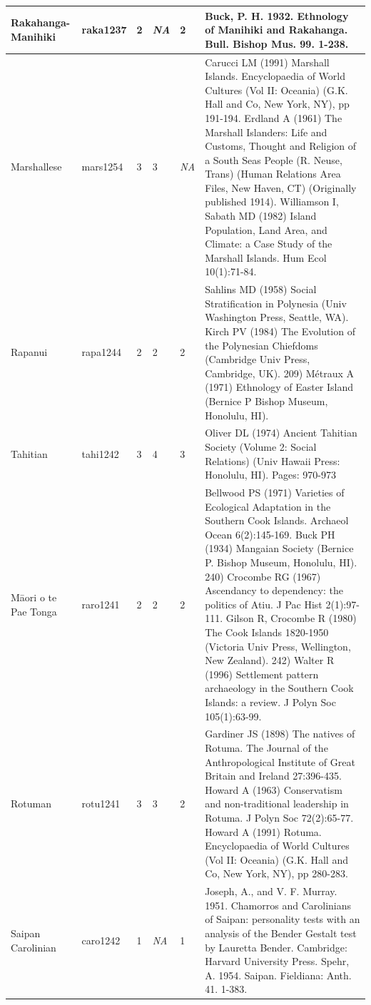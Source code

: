 \documentclass[draft,10pt]{article} %
\begin{document}
\begin{landscape}
\begin{longtable}{ | p{2cm}| p{2cm}| p{1.8cm}| p{1.8cm}| p{3cm}| p{9cm}| }
Rakahanga-Manihiki&raka1237&2&\emph{NA}&2&Buck, P. H. 1932. Ethnology of Manihiki and Rakahanga. Bull. Bishop Mus. 99. 1-238.\\ \hline
Marshallese&mars1254&3&3&\emph{NA}&Carucci LM (1991) Marshall Islands. Encyclopaedia of World Cultures (Vol II: Oceania) (G.K. Hall and Co, New York, NY), pp 191-194. Erdland A (1961) The Marshall Islanders: Life and Customs, Thought and Religion of a South Seas People (R. Neuse, Trans) (Human Relations Area Files, New Haven, CT) (Originally published 1914). Williamson I, Sabath MD (1982) Island Population, Land Area, and Climate: a Case Study of the Marshall Islands. Hum Ecol 10(1):71-84. \\ \hline
Rapanui&rapa1244&2&2&2&Sahlins MD (1958) Social Stratification in Polynesia (Univ Washington Press, Seattle, WA). Kirch PV (1984) The Evolution of the Polynesian Chiefdoms (Cambridge Univ Press, Cambridge, UK). 209) M\'{e}traux A (1971) Ethnology of Easter Island (Bernice P Bishop Museum, Honolulu, HI).\\ \hline
Tahitian&tahi1242&3&4&3&Oliver DL (1974) Ancient Tahitian Society (Volume 2: Social Relations) (Univ Hawaii Press: Honolulu, HI). Pages: 970-973\\ \hline
﻿Māori o te Pae Tonga&raro1241&2&2&2&Bellwood PS (1971) Varieties of Ecological Adaptation in the Southern Cook Islands. Archaeol Ocean 6(2):145-169. Buck PH (1934) Mangaian Society (Bernice P. Bishop Museum, Honolulu, HI). 240) Crocombe RG (1967) Ascendancy to dependency: the politics of Atiu. J Pac Hist 2(1):97-111. Gilson R, Crocombe R (1980) The Cook Islands 1820-1950 (Victoria Univ Press, Wellington, New Zealand). 242) Walter R (1996) Settlement pattern archaeology in the Southern Cook Islands: a review. J Polyn Soc 105(1):63-99. \\ \hline
Rotuman&rotu1241&3&3&2&Gardiner JS (1898) The natives of Rotuma. The Journal of the Anthropological Institute of Great Britain and Ireland 27:396-435. Howard A (1963) Conservatism and non-traditional leadership in Rotuma. J Polyn Soc 72(2):65-77. Howard A (1991) Rotuma. Encyclopaedia of World Cultures (Vol II: Oceania) (G.K. Hall and Co, New York, NY), pp 280-283. \\ \hline
Saipan Carolinian&caro1242&1&\emph{NA}&1&Joseph, A., and V. F. Murray. 1951. Chamorros and Carolinians of Saipan: personality tests with an analysis of the Bender Gestalt test by Lauretta Bender. Cambridge: Harvard University Press. Spehr, A. 1954. Saipan. Fieldiana: Anth. 41. 1-383.\\ \hline

\end{longtable}
\end{landscape}
\end{document}
